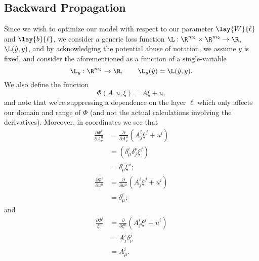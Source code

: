 \begin{comment}
Recalling that the gradient is the transpose of the exterior derivative in Euclidean space, we then conclude that
\begin{align*}
	\nabla F&=(dF)^T\\
	&=\left(\lay{dF}{2}+\lay{dF}{1}+\lay{dF}{0}\right)^T\\
	&=\nabla\lay{F}{2}+\nabla\lay{F}{1}+\nabla\lay{F}{0},
\end{align*}
and respectively,
\begin{align*}
	\nabla\lay{F}{2}&=\left(d(\L_y)_{\lay{a}{2}}\cdot d\lay{g}{2}_{\lay{z}{2}}\cdot d\lay{\phi}{2}_{(\lay{W}{2},\lay{b}{2},\{\lay{a}{1}\})}\right)^T
\end{align*}


\end{comment}

\subsection{Backward Propagation}\label{sec:backPropDerivation}

Since we wish to optimize our model with respect to our parameter $\lay{W}{\ell}$ and $\lay{b}{\ell}$,  we consider a generic loss function $\L:\R^{m_2}\times\R^{m_2}\to\R$, $\L(\hat{y},y)$, and by acknowledging the potential abuse of notation, we assume $y$ is fixed, and consider the aforementioned as a function of a single-variable
$$\L_y:\R^{m_2}\to\R, \qquad \L_y(\hat{y})=\L(\hat{y},y).$$
We also define the function
$$\Phi(A,u,\xi)=A\xi+u,$$
and note that we're suppressing a dependence on the layer $\ell$ which only affects our domain and range of $\Phi$ (and not the actual calculations involving the derivatives).  Moreover, in coordinates we see that
\begin{align*}
	\frac{\partial\Phi^i}{\partial A^\mu_\nu}&=\frac{\partial}{\partial A^\mu_\nu}(A^i_j\xi^j+u^i)\\
	&=(\delta^i_\mu\delta_j^\nu \xi^j)\\
	&=\delta^i_\mu \xi^\nu;
\end{align*}
\begin{align*}
	\frac{\partial\Phi^i}{\partial u^\mu}&=\frac{\partial}{\partial u^\mu}(A^i_j\xi^j+u^i)\\
	&=\delta^i_\mu;
\end{align*}
and
\begin{align*}
	\frac{\partial\Phi^i}{\xi^\mu}&=\frac{\partial}{\partial \xi^\mu}(A^i_j\xi^j+u^i)\\
	&=A^i_j\delta^j_\mu\\
	&=A^i_\mu.
\end{align*}





